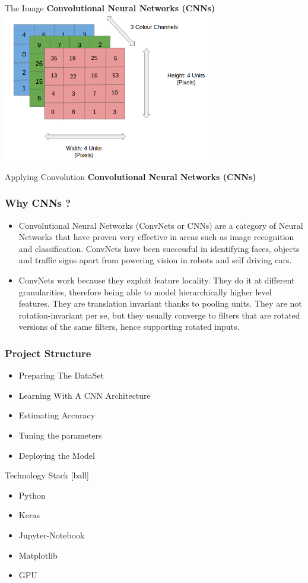 \documentclass{beamer}
\begin{document}
\begin{frame}{The Image}
 \textbf{Convolutional Neural Networks (CNNs)}
     \includegraphics[height=6.5cm,width=\textwidth]{img.png}
\end{frame}

 \begin{frame}{Applying Convolution}
 \textbf{Convolutional Neural Networks (CNNs)}
\end{frame}

\begin{frame}
\frametitle{Why CNNs ?}
\begin{itemize}
\item<1->Convolutional Neural Networks (ConvNets or CNNs) are a category of Neural Networks that have proven very effective in areas such as image recognition and classification. ConvNets have been successful in identifying faces, objects and traffic signs apart from powering vision in robots and self driving cars.
 \item<2->ConvNets work because they exploit feature locality. They do it at different granularities, therefore being able to model hierarchically higher level features. They are translation invariant thanks to pooling units. They are not rotation-invariant per se, but they usually converge to filters that are rotated versions of the same filters, hence supporting rotated inputs.
\end{itemize}
\end{frame}

\begin{frame}
\frametitle{Project Structure}
\begin{itemize}
 \item<1->Preparing The DataSet
 \item<2->Learning With A CNN Architecture
 \item<3->Estimating Accuracy
 \item<4->Tuning the parameters
 \item<5->Deploying the Model

\end{itemize}
\end{frame}

\begin{frame}{Technology Stack}
 [ball]
 \begin{itemize}
  \item Python
  \item Keras
  \item Jupyter-Notebook
  \item Matplotlib
  \item GPU

  \end{itemize}
\end{frame}
\end{document}
